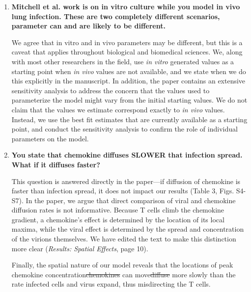 \documentclass[10pt]{article}
\newcommand{\removed}[1]{{\color{dkred}\sout{#1}}}
\newcommand{\new}[1]{{\color{dkgreen}#1}}
\newenvironment{response}{\fontfamily{cmr}}{\par}
\begin{document}
\begin{enumerate}
\begin{response}
\end{response}

\item \textbf{Mitchell et al. work is on in vitro culture while you model in vivo lung 
infection. These are two completely different scenarios, parameter can and are 
likely to be different.}

\begin{response}

  We agree that in vitro and in vivo parameters may be different, but
  this is a caveat that applies throughout biological and biomedical
  sciences.  We, along with most other researchers in the field, use
  \textit{in vitro} generated values as a starting point when
  \textit{in vivo} values are not available, and we state when we do this explicitly
  in the manuscript.  In addition, the paper contains an extensive
  sensitivity analysis to address the concern that the values used to
  parameterize the model might vary from the initial starting
  values. We do not claim that the values we estimate correspond
  exactly to  \textit{in vivo} values. Instead, we use the best fit
  estimates that are currently available as a starting point, and
  conduct the sensitivity analysis to confirm the role of individual parameters on the model.
\end{response}

\item \textbf{You state that chemokine diffuses SLOWER that infection spread. What if it diffuses faster?}

\begin{response}

This question is answered directly in the paper---if diffusion of
chemokine is faster than infection spread, it does not impact our
results (Table 3, Figs. S4-S7).  In the paper, we argue that direct comparison of
viral and chemokine diffusion rates is not informative. 
Because T cells climb the chemokine gradient, a chemokine's effect is
determined by the location of its local maxima, while the viral effect
is determined by the spread and concentration of the virions
themselves.  We have edited the text to make this distinction more clear (\textit{Results: Spatial Effects}, page 10).

\begin{displayquote}
Finally, the spatial nature of our model reveals that \new{the locations of peak chemokine concentration}\removed{chemokines} can \new{move}\removed{diffuse} more slowly than the rate infected cells and virus expand, thus misdirecting the T cells.
\end{displayquote}


\end{response}
\end{enumerate}
\end{document}
